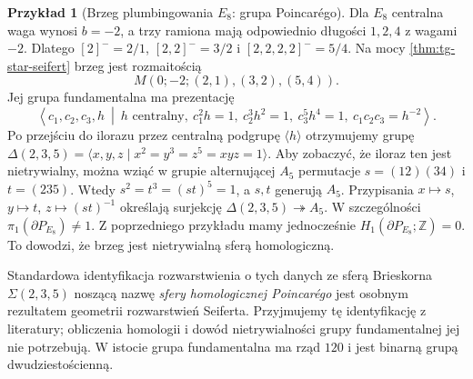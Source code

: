 \documentclass[11pt,a4paper]{report}
\numberwithin{equation}{section}
\theoremstyle{plain}
\theoremstyle{definition}
\newtheorem{przyklad}[twierdzenie]{Przykład}
\theoremstyle{remark}
\begin{document}
\begin{center}
\end{center}

\begin{przyklad}[Brzeg plumbingowania $E_8$: grupa Poincarégo]
\label{ex:tg-seifert-E8}
Dla $E_8$ centralna waga wynosi $b=-2$,
a trzy ramiona mają odpowiednio długości $1,2,4$
z wagami $-2$. Dlatego
$[2]^-=2/1$, $[2,2]^-=3/2$ i
$[2,2,2,2]^-=5/4$. Na mocy
\ref{thm:tg-star-seifert} brzeg jest rozmaitością
\[
M(0;-2;(2,1),(3,2),(5,4)).
\]
Jej grupa fundamentalna ma prezentację
\[
\left\langle c_1,c_2,c_3,h\ \middle|\
h\text{ centralny},\ c_1^2h=1,\ c_2^3h^2=1,
\ c_3^5h^4=1,\ c_1c_2c_3=h^{-2}\right\rangle.
\]
Po przejściu do ilorazu przez centralną podgrupę
$\langle h\rangle$ otrzymujemy grupę
$\Delta(2,3,5)=\langle x,y,z\mid x^2=y^3=z^5=xyz=1\rangle$.
Aby zobaczyć, że iloraz ten jest nietrywialny,
można wziąć w grupie alternującej $A_5$ permutacje
$s=(12)(34)$ i $t=(235)$. Wtedy $s^2=t^3=(st)^5=1$,
a $s,t$ generują $A_5$. Przypisania
$x\mapsto s$, $y\mapsto t$, $z\mapsto(st)^{-1}$
określają surjekcję $\Delta(2,3,5)\twoheadrightarrow A_5$.
W szczególności $\pi_1(\partial P_{E_8})\ne1$.
Z poprzedniego przykładu mamy jednocześnie
$H_1(\partial P_{E_8};\mathbb Z)=0$.
To dowodzi, że brzeg jest nietrywialną sferą homologiczną.

Standardowa identyfikacja rozwarstwienia o tych danych
ze sferą Brieskorna $\Sigma(2,3,5)$ noszącą nazwę
\emph{sfery homologicznej Poincarégo} jest osobnym
rezultatem geometrii rozwarstwień Seiferta. Przyjmujemy
tę identyfikację z literatury; obliczenia homologii i
dowód nietrywialności grupy fundamentalnej jej nie
potrzebują. W istocie grupa fundamentalna ma rząd $120$
i jest binarną grupą dwudziestościenną.
\end{przyklad}
\end{document}
